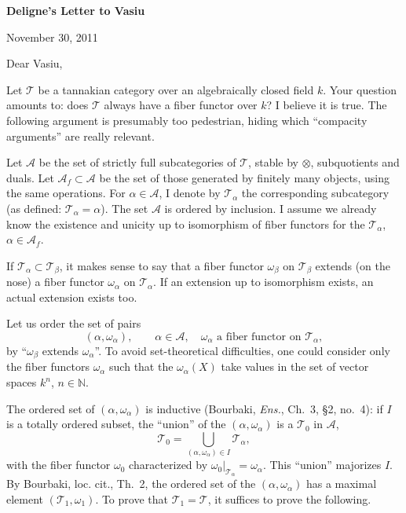 \documentclass[11pt]{article}
\newcommand{\T}{\mathcal T}
\newcommand{\A}{\mathcal A}
\newcommand{\Af}{\mathcal A_f}
\begin{document}
\begin{center}
{\large\bfseries Deligne's Letter to Vasiu}
\end{center}

\begin{flushright}
November 30, 2011
\end{flushright}

Dear Vasiu,

Let \(\T\) be a tannakian category over an algebraically closed field \(k\). Your question amounts to: does \(\T\) always have a fiber functor over \(k\)? I believe it is true. The following argument is presumably too pedestrian, hiding which ``compacity arguments'' are really relevant.

Let \(\A\) be the set of strictly full subcategories of \(\T\), stable by \(\otimes\), subquotients and duals. Let \(\Af\subset\A\) be the set of those generated by finitely many objects, using the same operations. For \(\alpha\in\A\), I denote by \(\T_\alpha\) the corresponding subcategory (as defined: \(\T_\alpha=\alpha\)). The set \(\A\) is ordered by inclusion. I assume we already know the existence and unicity up to isomorphism of fiber functors for the \(\T_\alpha\), \(\alpha\in\Af\).

If \(\T_\alpha\subset\T_\beta\), it makes sense to say that a fiber functor \(\omega_\beta\) on \(\T_\beta\) extends (on the nose) a fiber functor \(\omega_\alpha\) on \(\T_\alpha\). If an extension up to isomorphism exists, an actual extension exists too.

Let us order the set of pairs
\[
(\alpha,\omega_\alpha),\qquad \alpha\in\A,\quad \omega_\alpha\text{ a fiber functor on }\T_\alpha,
\]
by ``\(\omega_\beta\) extends \(\omega_\alpha\)''. To avoid set-theoretical difficulties, one could consider only the fiber functors \(\omega_\alpha\) such that the \(\omega_\alpha(X)\) take values in the set of vector spaces \(k^n\), \(n\in\mathbb N\).

The ordered set of \((\alpha,\omega_\alpha)\) is inductive (Bourbaki, \emph{Ens.}, Ch.~3, \S2, no.~4): if \(I\) is a totally ordered subset, the ``union'' of the \((\alpha,\omega_\alpha)\) is a \(\T_0\) in \(\A\),
\[
\T_0=\bigcup_{(\alpha,\omega_\alpha)\in I}\T_\alpha,
\]
with the fiber functor \(\omega_0\) characterized by \(\omega_0|_{\T_\alpha}=\omega_\alpha\). This ``union'' majorizes \(I\). By Bourbaki, loc. cit., Th.~2, the ordered set of the \((\alpha,\omega_\alpha)\) has a maximal element \((\T_1,\omega_1)\). To prove that \(\T_1=\T\), it suffices to prove the following.
\end{document}
